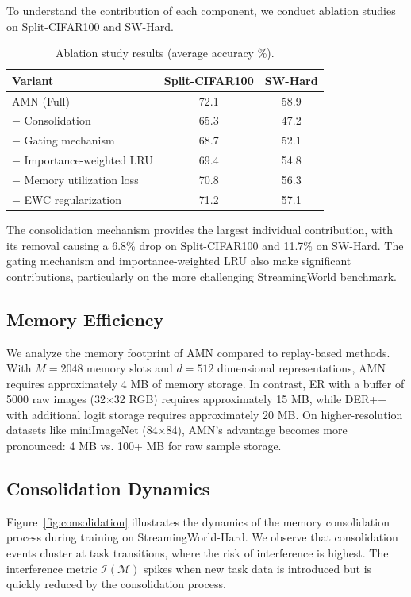 \documentclass[11pt]{article}
\begin{document}
To understand the contribution of each component, we conduct ablation studies on Split-CIFAR100 and SW-Hard.

\begin{table}[h]
\centering
\caption{Ablation study results (average accuracy \%).}
\label{tab:ablation}
\begin{tabular}{lcc}
\hline
Variant & Split-CIFAR100 & SW-Hard \\
\hline
AMN (Full) & 72.1 & 58.9 \\
$-$ Consolidation & 65.3 & 47.2 \\
$-$ Gating mechanism & 68.7 & 52.1 \\
$-$ Importance-weighted LRU & 69.4 & 54.8 \\
$-$ Memory utilization loss & 70.8 & 56.3 \\
$-$ EWC regularization & 71.2 & 57.1 \\
\hline
\end{tabular}
\end{table}

The consolidation mechanism provides the largest individual contribution, with its removal causing a 6.8\% drop on Split-CIFAR100 and 11.7\% on SW-Hard. The gating mechanism and importance-weighted LRU also make significant contributions, particularly on the more challenging StreamingWorld benchmark.

\subsection{Memory Efficiency}

We analyze the memory footprint of AMN compared to replay-based methods. With $M = 2048$ memory slots and $d = 512$ dimensional representations, AMN requires approximately 4 MB of memory storage. In contrast, ER with a buffer of 5000 raw images (32$\times$32 RGB) requires approximately 15 MB, while DER++ with additional logit storage requires approximately 20 MB. On higher-resolution datasets like miniImageNet (84$\times$84), AMN's advantage becomes more pronounced: 4 MB vs. 100+ MB for raw sample storage.

\subsection{Consolidation Dynamics}

Figure~\ref{fig:consolidation} illustrates the dynamics of the memory consolidation process during training on StreamingWorld-Hard. We observe that consolidation events cluster at task transitions, where the risk of interference is highest. The interference metric $\mathcal{I}(\mathcal{M})$ spikes when new task data is introduced but is quickly reduced by the consolidation process.
\end{document}
